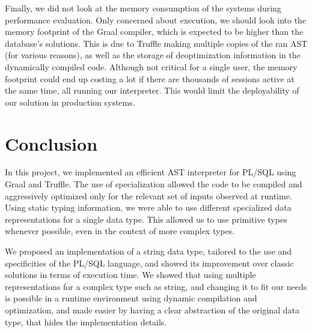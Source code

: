\documentclass[twoside,11pt,a4paper]{article}
\newcommand{\startsection}[1]{
	\cleardoublepage
	\section{#1}
	\thispagestyle{basic}
}
\begin{document}
Finally, we did not look at the memory consumption of the systems during performance evaluation. Only concerned about execution, we should look into the memory footprint of the Graal compiler, which is expected to be higher than the database's solutions. This is due to Truffle making multiple copies of the ran AST (for various reasons), as well as the storage of deoptimization information in the dynamically compiled code. Although not critical for a single user, the memory footprint could end up costing a lot if there are thousands of sessions active at the same time, all running our interpreter. This would limit the deployability of our solution in production systems.

\startsection{Conclusion}

In this project, we implemented an efficient AST interpreter for PL/SQL using Graal and Truffle. The use of specialization allowed the code to be compiled and aggressively optimized only for the relevant set of inputs observed at runtime. Using static typing information, we were able to use different specialized data representations for a single data type. This allowed us to use primitive types whenever possible, even in the context of more complex types.

We proposed an implementation of a string data type, tailored to the use and specificities of the PL/SQL language, and showed its improvement over classic solutions in terms of execution time. We showed that using multiple representations for a complex type such as string, and changing it to fit our needs is possible in a runtime environment using dynamic compilation and optimization, and made easier by having a clear abstraction of the original data type, that hides the implementation details.
\end{document}
